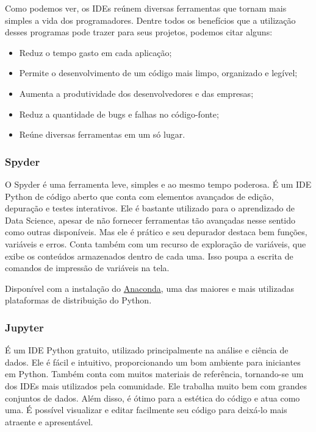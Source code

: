 \documentclass[
  brazilian,
  letterpaper,
  DIV=11,
  numbers=noendperiod]{scrreprt}
\providecommand{\tightlist}{%
  \setlength{\itemsep}{0pt}\setlength{\parskip}{0pt}}
\begin{document}
Como podemos ver, os IDEs reúnem diversas ferramentas que tornam mais
simples a vida dos programadores. Dentre todos os benefícios que a
utilização desses programas pode trazer para seus projetos, podemos
citar alguns:

\begin{itemize}
\tightlist
\item
  Reduz o tempo gasto em cada aplicação;
\item
  Permite o desenvolvimento de um código mais limpo, organizado e
  legível;
\item
  Aumenta a produtividade dos desenvolvedores e das empresas;
\item
  Reduz a quantidade de bugs e falhas no código-fonte;
\item
  Reúne diversas ferramentas em um só lugar.
\end{itemize}

\subsubsection{Spyder}\label{spyder}

O Spyder é uma ferramenta leve, simples e ao mesmo tempo poderosa. É um
IDE Python de código aberto que conta com elementos avançados de edição,
depuração e testes interativos. Ele é bastante utilizado para o
aprendizado de Data Science, apesar de não fornecer ferramentas tão
avançadas nesse sentido como outras disponíveis. Mas ele é prático e seu
depurador destaca bem funções, variáveis e erros. Conta também com um
recurso de exploração de variáveis, que exibe os conteúdos armazenados
dentro de cada uma. Isso poupa a escrita de comandos de impressão de
variáveis na tela.

Disponível com a instalação do
\href{https://www.anaconda.com/products/distribution}{Anaconda}, uma das
maiores e mais utilizadas plataformas de distribuição do Python.

\subsubsection{Jupyter}\label{jupyter}

É um IDE Python gratuito, utilizado principalmente na análise e ciência
de dados. Ele é fácil e intuitivo, proporcionando um bom ambiente para
iniciantes em Python. Também conta com muitos materiais de referência,
tornando-se um dos IDEs mais utilizados pela comunidade. Ele trabalha
muito bem com grandes conjuntos de dados. Além disso, é ótimo para a
estética do código e atua como uma. É possível visualizar e editar
facilmente seu código para deixá-lo mais atraente e apresentável.
\end{document}
